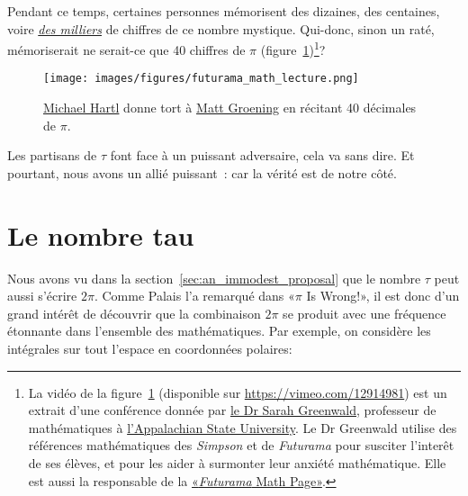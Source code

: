 Pendant ce temps, certaines personnes mémorisent des dizaines, des centaines,
voire
\href{https://www.guinnessworldrecords.com/world-records/most-pi-places-memorised}{\emph{des
milliers}} de chiffres de ce nombre mystique. Qui-donc, sinon un raté, mémoriserait ne serait-ce
que 40 chiffres de $\pi$ (figure~\ref{fig:futurama_video})\ns\footnote{La vidéo de la
figure~\ref{fig:futurama_video} (disponible sur
\url{https://vimeo.com/12914981}) est un extrait d'une conférence donnée par
\href{https://cs.appstate.edu/~sjg/}{le Dr Sarah Greenwald}, professeur de
mathématiques à \href{https://www.appstate.edu/}{l'Appalachian State
University}. Le Dr Greenwald utilise des références mathématiques des
\emph{Simpson} et de \emph{Futurama} pour susciter l'interêt de ses élèves, et
pour les aider à surmonter leur anxiété mathématique. Elle est aussi la
responsable de la \href{https://cs.appstate.edu/~sjg/futurama/}{«\ns \emph{Futurama}
Math Page\ns »}.}\ns?

\begin{figure}
\begin{center}
\texttt{[image: images/figures/futurama\_math\_lecture.png]} %
\end{center}
\caption{\href{https://tauday.com/tau-manifesto/\#sec-about_the_author}{Michael
Hartl} donne tort à \href{https://fr.wikipedia.org/wiki/Matt_Groening}{Matt
Groening} en récitant 40 décimales de $\pi$.\label{fig:futurama_video}}
\end{figure}

Les partisans de $\tau$ font face à un puissant adversaire, cela va sans dire. Et
pourtant, nous avons un allié puissant~: car la vérité est de notre côté.


\section{Le nombre tau} %
\label{sec:the_number_tau}

Nous avons vu dans la section~\ref{sec:an_immodest_proposal} que le nombre $\tau$ peut aussi s'écrire
$2\pi$. Comme Palais l'a remarqué dans «\ns $\pi$ Is Wrong!\ns », il est donc d'un grand
intérêt de découvrir que la combinaison $2\pi$ se produit avec une fréquence
étonnante dans l'ensemble des mathématiques. Par exemple, on considère les
intégrales sur tout l'espace en coordonnées polaires:

